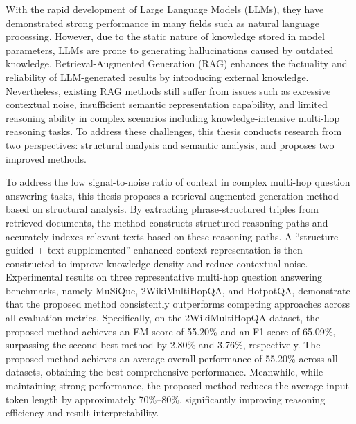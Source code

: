 \begin{eabstract}

  With the rapid development of Large Language Models (LLMs), they have demonstrated strong performance in many fields such as natural language processing.
  However, due to the static nature of knowledge stored in model parameters, LLMs are prone to generating hallucinations caused by outdated knowledge.
  Retrieval-Augmented Generation (RAG) enhances the factuality and reliability of LLM-generated results by introducing external knowledge.
  Nevertheless, existing RAG methods still suffer from issues such as excessive contextual noise, insufficient semantic representation capability, and limited reasoning ability in complex scenarios including knowledge-intensive multi-hop reasoning tasks.
  To address these challenges, this thesis conducts research from two perspectives: structural analysis and semantic analysis, and proposes two improved methods.

  To address the low signal-to-noise ratio of context in complex multi-hop question answering tasks, this thesis proposes a retrieval-augmented generation method based on structural analysis.
  By extracting phrase-structured triples from retrieved documents, the method constructs structured reasoning paths and accurately indexes relevant texts based on these reasoning paths.
  A “structure-guided + text-supplemented” enhanced context representation is then constructed to improve knowledge density and reduce contextual noise.
  Experimental results on three representative multi-hop question answering benchmarks, namely MuSiQue, 2WikiMultiHopQA, and HotpotQA, demonstrate that the proposed method consistently outperforms competing approaches across all evaluation metrics.
  Specifically, on the 2WikiMultiHopQA dataset, the proposed method achieves an EM score of 55.20\% and an F1 score of 65.09\%, surpassing the second-best method by 2.80\% and 3.76\%, respectively.
  The proposed method achieves an average overall performance of 55.20\% across all datasets, obtaining the best comprehensive performance.
  Meanwhile, while maintaining strong performance, the proposed method reduces the average input token length by approximately 70\%--80\%, significantly improving reasoning efficiency and result interpretability.


\end{eabstract}
